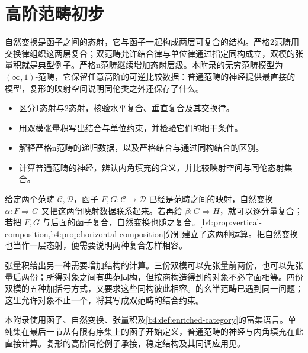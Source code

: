 
\chapter{高阶范畴初步}
\label{b4:app:F}

\begin{chapterabstract}
	自然变换是函子之间的态射，它与函子一起构成两层可复合的结构。严格2范畴用交换律组织这两层复合；双范畴允许结合律与单位律通过指定同构成立，双模的张量积就是典型例子。严格n范畴继续增加态射层级。本附录的无穷范畴模型为 \((\infty,1)\)-范畴，它保留任意高阶的可逆比较数据：普通范畴的神经提供最直接的模型，复形的映射空间说明同伦类之外还保存了什么。
\end{chapterabstract}

\begin{learninggoals}
	\begin{itemize}
		\item 区分1态射与2态射，核验水平复合、垂直复合及其交换律。
		\item 用双模张量积写出结合与单位约束，并检验它们的相干条件。
		\item 解释严格n范畴的递归数据，以及严格结合与通过同构结合的区别。
		\item 计算普通范畴的神经，辨认内角填充的含义，并比较映射空间与同伦态射集合。
	\end{itemize}
\end{learninggoals}

给定两个范畴 \(\mathcal C,\mathcal D\)，函子 \(F,G:\mathcal C\rightarrow\mathcal D\) 已经是范畴之间的映射，自然变换 \(\alpha:F\Rightarrow G\) 又把这两份映射数据联系起来。若再给 \(\beta:G\Rightarrow H\)，就可以逐分量复合；若把 \(F,G\) 与后面的函子复合，自然变换也随之复合。\cref{b4:prop:vertical-composition,b4:prop:horizontal-composition}分别建立了这两种运算。把自然变换也当作一层态射，便需要说明两种复合怎样相容。

\ProseParagraphBreak
张量积给出另一种需要增加结构的计算。三份双模可以先张量前两份，也可以先张量后两份；所得对象之间有典范同构，但按商构造得到的对象不必字面相等。四份双模的五种加括号方式，又要求这些同构彼此相容。的幺半范畴已遇到同一问题；这里允许对象不止一个，将其写成双范畴的结合约束。

\ProseParagraphBreak
本附录使用函子、自然变换、张量积及\cref{b4:def:enriched-category}的富集语言。单纯集在最后一节从有限有序集上的函子开始定义，普通范畴的神经与内角填充在此直接计算。复形的高阶同伦例子承接，稳定结构及其同调应用见。

